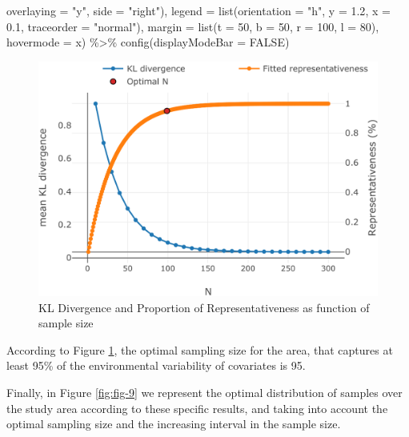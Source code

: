 \documentclass[
]{book}
\newenvironment{Shaded}{\begin{snugshade}}{\end{snugshade}}
\newcommand{\AttributeTok}[1]{\textcolor[rgb]{0.77,0.63,0.00}{#1}}
\newcommand{\ConstantTok}[1]{\textcolor[rgb]{0.00,0.00,0.00}{#1}}
\newcommand{\DecValTok}[1]{\textcolor[rgb]{0.00,0.00,0.81}{#1}}
\newcommand{\FloatTok}[1]{\textcolor[rgb]{0.00,0.00,0.81}{#1}}
\newcommand{\FunctionTok}[1]{\textcolor[rgb]{0.00,0.00,0.00}{#1}}
\newcommand{\NormalTok}[1]{#1}
\newcommand{\SpecialCharTok}[1]{\textcolor[rgb]{0.00,0.00,0.00}{#1}}
\newcommand{\StringTok}[1]{\textcolor[rgb]{0.31,0.60,0.02}{#1}}
\begin{document}
\begin{Shaded}
\begin{Highlighting}[]
                       \AttributeTok{overlaying =} \StringTok{"y"}\NormalTok{, }\AttributeTok{side =} \StringTok{"right"}\NormalTok{),}
         \AttributeTok{legend =} \FunctionTok{list}\NormalTok{(}\AttributeTok{orientation =} \StringTok{"h"}\NormalTok{, }\AttributeTok{y =} \FloatTok{1.2}\NormalTok{, }\AttributeTok{x =} \FloatTok{0.1}\NormalTok{,}
                       \AttributeTok{traceorder =} \StringTok{"normal"}\NormalTok{),}
         \AttributeTok{margin =} \FunctionTok{list}\NormalTok{(}\AttributeTok{t =} \DecValTok{50}\NormalTok{, }\AttributeTok{b =} \DecValTok{50}\NormalTok{, }\AttributeTok{r =} \DecValTok{100}\NormalTok{, }\AttributeTok{l =} \DecValTok{80}\NormalTok{),}
         \AttributeTok{hovermode =} \StringTok{\textquotesingle{}x\textquotesingle{}}\NormalTok{)  }\SpecialCharTok{\%\textgreater{}\%} 
  \FunctionTok{config}\NormalTok{(}\AttributeTok{displayModeBar =} \ConstantTok{FALSE}\NormalTok{) }
\end{Highlighting}
\end{Shaded}

\begin{figure}
\centering
\includegraphics{Technical-Manual-Soil-Sampling-Design_files/figure-latex/fig-8-1.pdf}
\caption{\label{fig:fig-8}KL Divergence and Proportion of Representativeness as function of sample size}
\end{figure}

According to Figure \ref{fig:fig-8}, the optimal sampling size for the area, that captures at least 95\% of the environmental variability of covariates is 95.

Finally, in Figure \ref{fig:fig-9} we represent the optimal distribution of samples over the study area according to these specific results, and taking into account the optimal sampling size and the increasing interval in the sample size.
\end{document}
